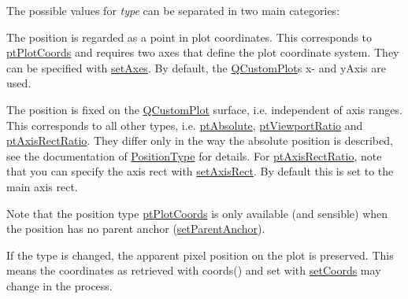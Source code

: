 The possible values for {\itshape type} can be separated in two main categories\+:

\begin{DoxyItemize}
\item The position is regarded as a point in plot coordinates. This corresponds to \hyperlink{class_q_c_p_item_position_aad9936c22bf43e3d358552f6e86dbdc8ae797603bd91e9561c0f2da044a30e5c6}{pt\+Plot\+Coords} and requires two axes that define the plot coordinate system. They can be specified with \hyperlink{class_q_c_p_item_position_a2185f45c75ac8cb9be89daeaaad50e37}{set\+Axes}. By default, the \hyperlink{class_q_custom_plot}{Q\+Custom\+Plot}\textquotesingle{}s x-\/ and y\+Axis are used.\end{DoxyItemize}
\begin{DoxyItemize}
\item The position is fixed on the \hyperlink{class_q_custom_plot}{Q\+Custom\+Plot} surface, i.\+e. independent of axis ranges. This corresponds to all other types, i.\+e. \hyperlink{class_q_c_p_item_position_aad9936c22bf43e3d358552f6e86dbdc8a3702d60f75c3259c625381c9675c053e}{pt\+Absolute}, \hyperlink{class_q_c_p_item_position_aad9936c22bf43e3d358552f6e86dbdc8ad2ec2c0f63a73a94c098af9334903f9b}{pt\+Viewport\+Ratio} and \hyperlink{class_q_c_p_item_position_aad9936c22bf43e3d358552f6e86dbdc8a5122cb53066293593ba4445ea9a75391}{pt\+Axis\+Rect\+Ratio}. They differ only in the way the absolute position is described, see the documentation of \hyperlink{class_q_c_p_item_position_aad9936c22bf43e3d358552f6e86dbdc8}{Position\+Type} for details. For \hyperlink{class_q_c_p_item_position_aad9936c22bf43e3d358552f6e86dbdc8a5122cb53066293593ba4445ea9a75391}{pt\+Axis\+Rect\+Ratio}, note that you can specify the axis rect with \hyperlink{class_q_c_p_item_position_a0cd9b326fb324710169e92e8ca0041c2}{set\+Axis\+Rect}. By default this is set to the main axis rect.\end{DoxyItemize}
Note that the position type \hyperlink{class_q_c_p_item_position_aad9936c22bf43e3d358552f6e86dbdc8ae797603bd91e9561c0f2da044a30e5c6}{pt\+Plot\+Coords} is only available (and sensible) when the position has no parent anchor (\hyperlink{class_q_c_p_item_position_ac094d67a95d2dceafa0d50b9db3a7e51}{set\+Parent\+Anchor}).

If the type is changed, the apparent pixel position on the plot is preserved. This means the coordinates as retrieved with coords() and set with \hyperlink{class_q_c_p_item_position_aa988ba4e87ab684c9021017dcaba945f}{set\+Coords} may change in the process.

